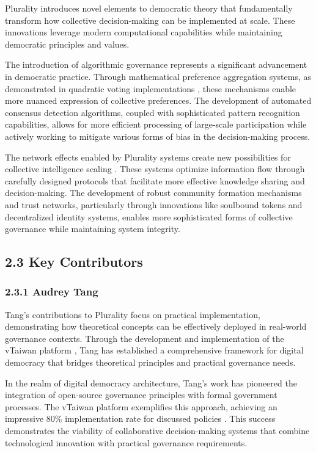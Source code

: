 Plurality introduces novel elements to democratic theory that fundamentally transform how collective decision-making can be implemented at scale. These innovations leverage modern computational capabilities while maintaining democratic principles and values.

The introduction of algorithmic governance represents a significant advancement in democratic practice. Through mathematical preference aggregation systems, as demonstrated in quadratic voting implementations \citep{buterin2019flexible}, these mechanisms enable more nuanced expression of collective preferences. The development of automated consensus detection algorithms, coupled with sophisticated pattern recognition capabilities, allows for more efficient processing of large-scale participation while actively working to mitigate various forms of bias in the decision-making process.

The network effects enabled by Plurality systems create new possibilities for collective intelligence scaling \citep{weyl2022decentralized}. These systems optimize information flow through carefully designed protocols that facilitate more effective knowledge sharing and decision-making. The development of robust community formation mechanisms and trust networks, particularly through innovations like soulbound tokens and decentralized identity systems, enables more sophisticated forms of collective governance while maintaining system integrity.

\hypertarget{key-contributors}{%
\subsection{2.3 Key Contributors}\label{key-contributors}}

\hypertarget{audrey-tang}{%
\subsubsection{2.3.1 Audrey Tang}\label{audrey-tang}}

Tang's contributions to Plurality focus on practical implementation, demonstrating how theoretical concepts can be effectively deployed in real-world governance contexts. Through the development and implementation of the vTaiwan platform \citep{vtaiwan2023}, Tang has established a comprehensive framework for digital democracy that bridges theoretical principles and practical governance needs.

In the realm of digital democracy architecture, Tang's work has pioneered the integration of open-source governance principles with formal government processes. The vTaiwan platform exemplifies this approach, achieving an impressive 80\% implementation rate for discussed policies \citep{vtaiwan2023}. This success demonstrates the viability of collaborative decision-making systems that combine technological innovation with practical governance requirements.

